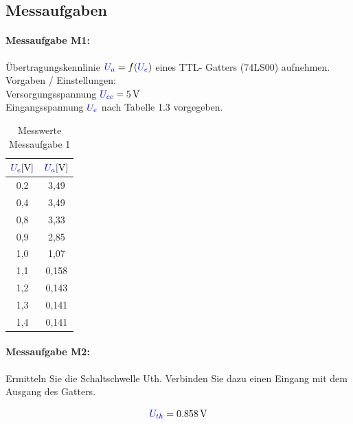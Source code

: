 \documentclass[a4paper,titlepage,parskip]{scrreprt}
\newcommand{\spannung}[1]{\textcolor{blue}{#1}}
\begin{document}
      \subsection{Messaufgaben}
        \paragraph{Messaufgabe M1:} Übertragungskennlinie $\spannung{U_a} = f(\spannung{U_e})$ eines TTL- Gatters (74LS00) aufnehmen.\\
          Vorgaben / Einstellungen:\\
          Versorgungsspannung $\spannung{U_{cc}} = \SI{5}{\volt}$\\
          Eingangsspannung $\spannung{U_e}$ nach Tabelle 1.3 vorgegeben.

          \begin{center}
            \begin{table}[!hbtp]
              \caption{Messwerte Messaufgabe 1}
              \renewcommand{\arraystretch}{1.3}
              \begin{center}
                \begin{tabular}{c|c}
                  $\spannung{U_e} [\si{\volt}]$ & $\spannung{U_a} [\si{\volt}]$ \\ \hline
                  0,2 & 3,49\\
                  0,4 & 3,49\\
                  0,8 & 3,33\\
                  0,9 & 2,85\\
                  1,0 & 1,07\\
                  1,1 & 0,158\\
                  1,2 & 0,143\\
                  1,3 & 0,141\\
                  1,4 & 0,141
                \end{tabular}
              \end{center}
            \end{table}
          \end{center}

        \paragraph{Messaufgabe M2:} Ermitteln Sie die Schaltschwelle Uth. Verbinden Sie dazu einen Eingang mit dem Ausgang des Gatters.

          \begin{equation*}
            \spannung{U_{th}} = \SI{0,858}{\volt}
          \end{equation*}
\end{document}
